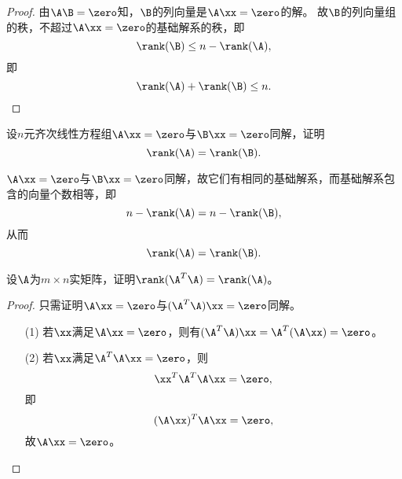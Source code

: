 \begin{proof}
由$\A\B=\zero$知，$\B$的列向量是$\A\xx=\zero$的解。
故$\B$的列向量组的秩，不超过$\A\xx=\zero$的基础解系的秩，即
$$
\rank(\B) \le n-\rank(\A),
$$
即
$$
\rank(\A)+\rank(\B)\le n.
$$
\end{proof}

\begin{li}
  设$n$元齐次线性方程组$\A\xx=\zero$与$\B\xx=\zero$同解，证明
  $$
  \rank(\A)=\rank(\B).
  $$
\end{li}

\begin{jie}
$\A\xx=\zero$与$\B\xx=\zero$同解，故它们有相同的基础解系，而基础解系包含的向量个数相等，即
$$
n-\rank(\A)=n-\rank(\B),
$$
从而
$$
\rank(\A)=\rank(\B).
$$
\end{jie}





\begin{li}
  设$\A$为$m\times n$实矩阵，证明$\rank(\A^T\A)=\rank(\A)$。    
\end{li}
\begin{proof}
只需证明$\A\xx=\zero$与$(\A^T\A)\xx=\zero$同解。
\begin{itemize}
\item[(1)] 若$\xx$满足$\A\xx=\zero$，则有$(\A^T\A)\xx=\A^T(\A\xx)=\zero$。 
\item[(2)] 若$\xx$满足$\A^T\A\xx=\zero$，则
  $$
  \xx^T\A^T\A\xx=\zero,
  $$
  即
  $$
  (\A\xx)^T\A\xx=\zero,
  $$
  故$\A\xx=\zero$。
\end{itemize}
\end{proof}





